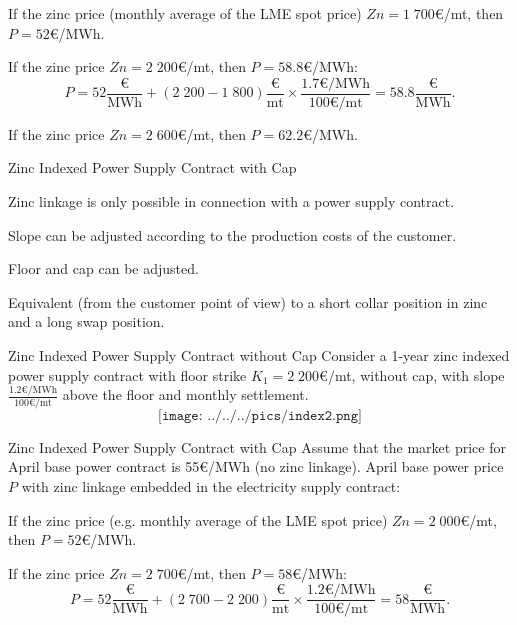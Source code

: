 



	If the zinc price (monthly average of the LME spot price) $Zn=1\;700$€/mt, then \textcolor[rgb]{0.00,0.00,1.00}{$P=52$€/MWh}.


	If the zinc price $Zn=2\;200$€/mt, then \textcolor[rgb]{0.00,0.00,1.00}{$P=58.8$€/MWh}:
  $$P=52\frac{\text{€}}{\text{MWh}}+(2\;200-1\;800)\frac{\text{€}}{\text{mt}}\times\frac{1.7\text{€/MWh}}{100\text{€/mt}}=58.8\frac{\text{€}}{\text{MWh}}.$$


	If the zinc price $Zn=2\;600$€/mt, then \textcolor[rgb]{0.00,0.00,1.00}{$P=62.2$€/MWh}.





{Zinc Indexed Power Supply Contract with Cap}






	Zinc linkage is only possible in connection with a power supply contract.


	Slope can be adjusted according to the production costs of the customer.


	Floor and cap can be adjusted.


	Equivalent (from the customer point of view) to a short collar position in zinc and a long swap position.





{Zinc Indexed Power Supply Contract without Cap}
Consider a 1-year zinc indexed power supply contract with floor strike $K_1=2\;200$€/mt, without cap, with slope $\frac{1.2\text{€/MWh}}{100\text{€/mt}}$ above the floor and monthly settlement.
$$\texttt{[image: ../../../pics/index2.png]}$$

{Zinc Indexed Power Supply Contract with Cap}
Assume that the market price for April base power contract is \textcolor[rgb]{1.00,0.00,0.00}{55€/MWh} (no zinc linkage). April base power price $P$ with zinc linkage embedded in the electricity supply contract:
\vspace{0.4cm}






	If the zinc price (e.g. monthly average of the LME spot price) $Zn=2\;000$€/mt, then \textcolor[rgb]{0.00,0.00,1.00}{$P=52$€/MWh}.


	If the zinc price $Zn=2\;700$€/mt, then \textcolor[rgb]{0.00,0.00,1.00}{$P=58$€/MWh}:
  $$P=52\frac{\text{€}}{\text{MWh}}+(2\;700-2\;200)\frac{\text{€}}{\text{mt}}\times\frac{1.2\text{€/MWh}}{100\text{€/mt}}=58\frac{\text{€}}{\text{MWh}}.$$


